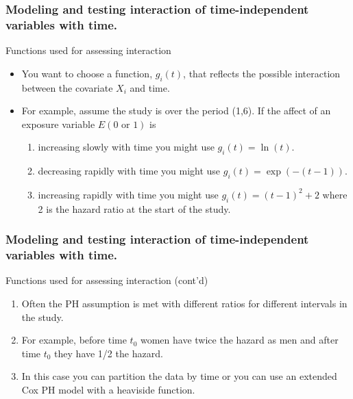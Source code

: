 \documentclass{beamer}
\theoremstyle{definition}
\begin{document}
\begin{frame}
\frametitle{Modeling and testing interaction of time-independent variables with time.} 
\begin{block}{Functions used for assessing interaction}
\begin{itemize}
\item You want to choose a function, $g_i(t)$, that reflects the possible interaction between the covariate $X_i$ and time.
\item For example, assume the study is over the period (1,6). If the affect of an exposure variable $E (0 \text{ or } 1)$ is
\begin{enumerate}
\item increasing slowly with time you might use $g_i(t)= \ln(t)$.
\item decreasing rapidly with time you might use $g_i(t)=\exp(-(t-1))$.
\item increasing rapidly with time you might use $g_i(t)=(t-1)^2+2$ where 2 is the hazard ratio at the start of the study.
\end{enumerate}
\end{itemize}
\end{block}
\end{frame}


\begin{frame}
\frametitle{Modeling and testing interaction of time-independent variables with time.} 
\begin{block}{Functions used for assessing interaction (cont'd)}
\begin{enumerate}
\item Often the PH assumption is met with different ratios for different intervals in the study.
\item For example, before time $t_0$ women have twice the hazard as men and after time $t_0$ they have 1/2 the hazard.
\item In this case you can partition the data by time or you can use an extended Cox PH model with a heaviside function.
\end{enumerate}
\end{block}
\end{frame}
\end{document}
